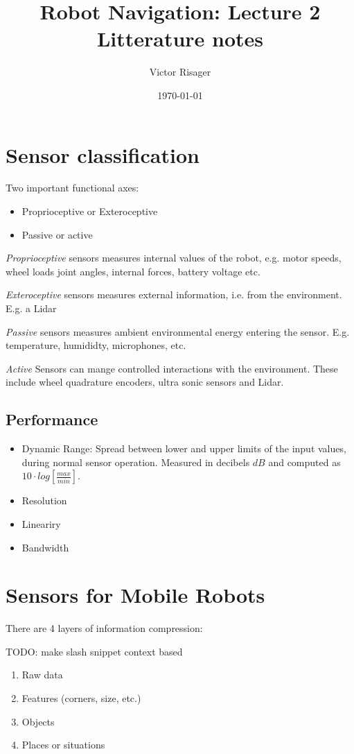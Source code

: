 \documentclass{article}
\title{Robot Navigation: Lecture 2 \\
	\large Litterature notes}
\author{Victor Risager}
\date{\today}
\begin{document}
\maketitle

\section{Sensor classification}
Two important functional axes:
\begin{itemize}
	\item Proprioceptive or Exteroceptive
	\item Passive or active
\end{itemize}

\textit{Proprioceptive} sensors measures internal values of the robot, e.g. motor speeds, wheel loads joint angles, internal forces, battery voltage etc. 

\textit{Exteroceptive} sensors measures external information, i.e. from the environment. E.g. a Lidar 


\textit{Passive} sensors measures ambient environmental energy entering the sensor. E.g. temperature, humididty, microphones, etc. 

\textit{Active} Sensors can mange controlled interactions with the environment. These include wheel quadrature encoders, ultra sonic sensors and Lidar. 

\subsection{Performance}
\begin{itemize}
	\item Dynamic Range: Spread between lower and upper limits of the input values, during normal sensor operation. Measured in decibels $dB$ and computed as  $10 \cdot log[\frac{max}{min}]$. 
	\item Resolution
	\item Lineariry
	\item Bandwidth
\end{itemize}

\newpage


\section{Sensors for Mobile Robots}
There are 4 layers of information compression:


TODO: make slash snippet context based
\begin{enumerate}
	\item Raw data
	\item Features (corners, size, etc.)
	\item Objects
	\item Places or situations
\end{enumerate}
\end{document}
